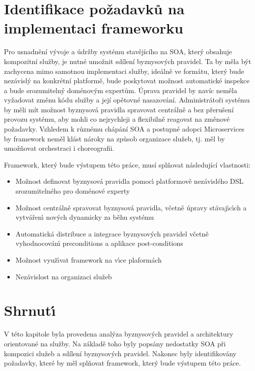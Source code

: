 \section{Identifikace požadavků na implementaci frameworku}\label{sec:implementation-requirements}

Pro usnadnění vývoje a údržby systému stavějícího na \gls{SOA}, který
obsahuje kompozitní služby, je nutné umožnit sdílení byznysových pravidel.
Ta by měla být zachycena mimo samotnou implementaci služby, ideálně ve formátu, který bude nezávislý na
konkrétní platformě, bude poskytovat možnost automatické inspekce a bude srozumitelný doménovým expertům.
Úprava pravidel by navíc neměla vyžadovat změnu kódu služby a její opětovné nasazování.
Administrátoři systému by měli mít možnost byznysová pravidla spravovat centrálně a bez
přerušení provozu systému, aby mohli co nejrychleji a flexibilně reagovat na změnové požadavky.
Vzhledem k různému chápání \gls{SOA} a postupné adopci Microservices by framework neměl klást
nároky na způsob organizace služeb, tj. měl by umožňovat orchestraci i choreografii.

Framework, který bude výstupem této práce, musí splňovat následující vlastnosti:

\begin{itemize}
    \item{Možnost definovat byznysová pravidla pomoc\'{\i} platformově nezávislého \gls{DSL} srozumitelného pro doménové experty}
    \item{Možnost centrálně spravovat byznysová pravidla, včetně úpravy stávaj\'{\i}c\'{\i}ch a vytvářen\'{\i} nov\'ych dynamicky za běhu systému}
    \item{Automatická distribuce a integrace byznysových pravidel včetně vyhodnocován\'{\i} preconditions a aplikace post-conditions}
    \item{Možnost využ\'{\i}vat framework na v\'{\i}ce plaformách}
    \item{Nezávislost na organizaci služeb}
\end{itemize}

\section{Shrnut\'{\i}}

V této kapitole byla provedena analýza byznysov\'ych pravidel a architektury orientované na služby.
Na základě toho byly popsány nedostatky \gls{SOA} při kompozici služeb a sdílení byznysových pravidel.
Nakonec byly identifikovány požadavky, které by měl splňovat framework, který bude v\'ystupem této práce.
